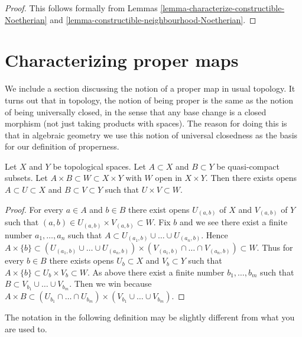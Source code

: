 \begin{proof}
This follows formally from
Lemmas \ref{lemma-characterize-constructible-Noetherian} and
\ref{lemma-constructible-neighbourhood-Noetherian}.
\end{proof}







\section{Characterizing proper maps}
\label{section-proper}

\noindent
We include a section discussing the notion of a proper map in usual
topology. It turns out that in topology, the notion of being proper
is the same as the notion of being universally closed, in the sense
that any base change is a closed morphism (not just taking products
with spaces). The reason for doing this is that in algebraic geometry
we use this notion of universal closedness as the basis for our
definition of properness.

\begin{lemma}
\label{lemma-tube}
Let $X$ and $Y$ be topological spaces.
Let $A \subset X$ and $B \subset Y$ be quasi-compact subsets.
Let $A \times B \subset W \subset X \times Y$ with $W$
open in $X \times Y$. Then there exists opens $A \subset U \subset X$
and $B \subset V \subset Y$ such that $U \times V \subset W$.
\end{lemma}

\begin{proof}
For every $a \in A$ and $b \in B$ there exist opens
$U_{(a, b)}$ of $X$ and $V_{(a, b)}$ of $Y$ such that
$(a, b) \in U_{(a, b)} \times V_{(a, b)} \subset W$.
Fix $b$ and we see there exist a finite number $a_1, \ldots, a_n$
such that $A \subset U_{(a_1, b)} \cup \ldots \cup U_{(a_n, b)}$.
Hence $A \times \{b\} \subset
(U_{(a_1, b)} \cup \ldots \cup U_{(a_n, b)}) \times
(V_{(a_1, b)} \cap \ldots \cap V_{(a_n, b)}) \subset W$.
Thus for every $b \in B$ there exists opens $U_b \subset X$ and
$V_b \subset Y$ such that $A \times \{b\} \subset U_b \times V_b \subset W$.
As above there exist a finite number $b_1, \ldots, b_m$ such
that $B \subset V_{b_1} \cup \ldots \cup V_{b_m}$.
Then we win because
$A \times B \subset
(U_{b_1} \cap \ldots \cap U_{b_m}) \times
(V_{b_1} \cup \ldots \cup V_{b_m})$.
\end{proof}

\noindent
The notation in the following definition may be slightly different
from what you are used to.

